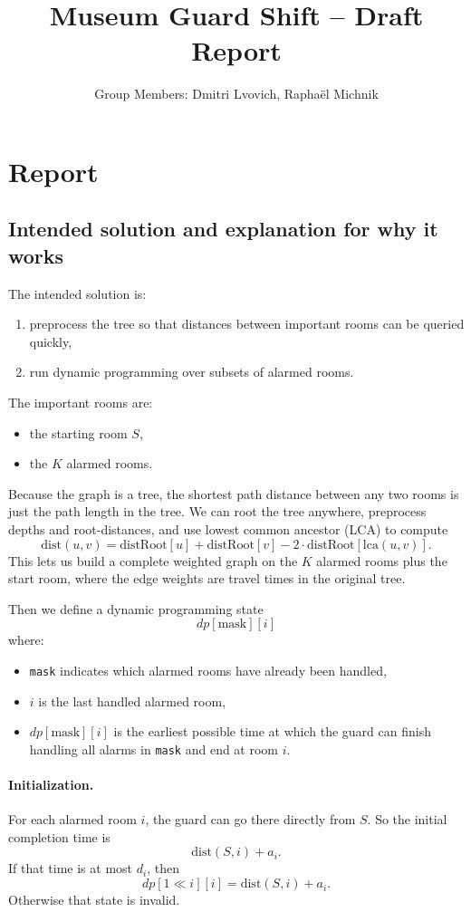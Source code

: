 \documentclass[11pt]{article}
\title{Museum Guard Shift -- Draft Report}
\author{Group Members: Dmitri Lvovich, Raphaël Michnik}
\date{}
\begin{document}
\maketitle

\section*{Report}

\subsection*{Intended solution and explanation for why it works}
The intended solution is:
\begin{enumerate}
    \item preprocess the tree so that distances between important rooms can be queried quickly,
    \item run dynamic programming over subsets of alarmed rooms.
\end{enumerate}

The important rooms are:
\begin{itemize}
    \item the starting room $S$,
    \item the $K$ alarmed rooms.
\end{itemize}

Because the graph is a tree, the shortest path distance between any two rooms is just the path length in the tree. We can root the tree anywhere, preprocess depths and root-distances, and use lowest common ancestor (LCA) to compute
\[
\mathrm{dist}(u,v)=\mathrm{distRoot}[u]+\mathrm{distRoot}[v]-2\cdot \mathrm{distRoot}[\mathrm{lca}(u,v)].
\]
This lets us build a complete weighted graph on the $K$ alarmed rooms plus the start room, where the edge weights are travel times in the original tree.

Then we define a dynamic programming state
\[
dp[\text{mask}][i]
\]
where:
\begin{itemize}
    \item \texttt{mask} indicates which alarmed rooms have already been handled,
    \item $i$ is the last handled alarmed room,
    \item $dp[\text{mask}][i]$ is the earliest possible time at which the guard can finish handling all alarms in \texttt{mask} and end at room $i$.
\end{itemize}

\paragraph{Initialization.}
For each alarmed room $i$, the guard can go there directly from $S$. So the initial completion time is
\[
\mathrm{dist}(S,i)+a_i.
\]
If that time is at most $d_i$, then
\[
dp[1\ll i][i]=\mathrm{dist}(S,i)+a_i.
\]
Otherwise that state is invalid.
\end{document}
